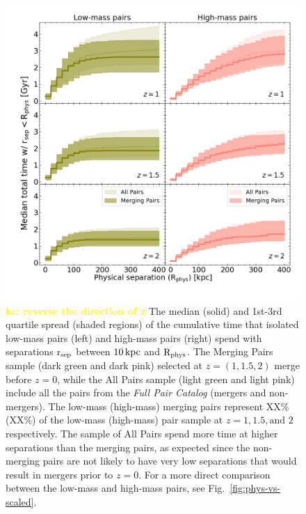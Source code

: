 \documentclass[twocolumn]{aastex631}
\newcommand{\kc}[1]{\textcolor{yellow}{\textbf{kc: #1}} }
\newcommand{\rsep}{\ensuremath{\rm r_{sep}}}
\newcommand{\paircat}{\textit{Full Pair Catalog}}
\newcommand{\Rphys}{\ensuremath{\rm R_{phys}}}
\newcommand{\rsep}{\ensuremath{\rm r_{sep}}}
\begin{document}
\begin{figure}[htb]
    \centering
    \includegraphics[width=\textwidth]{plots/bet-on-it/2_medtotal_LoHi.png}
    \caption{\kc{reverse the direction of z} 
    The median (solid) and 1st-3rd quartile spread (shaded regions) of the cumulative time that isolated low-mass pairs (left) and high-mass pairs (right) spend with separations \rsep{} between $10\mathrm{\,kpc}$ and \Rphys{}. 
    The Merging Pairs sample (dark green and dark pink) selected at $z=(1,1.5,2)$ merge before $z=0$, while the All Pairs sample (light green and light pink) include all the pairs from the \paircat{} (mergers and non-mergers).  
    The low-mass (high-mass) merging pairs represent XX\%(XX\%) of the low-mass (high-mass) pair sample at $z=1,1.5, \mbox{and } 2$ respectively. 
    The sample of All Pairs spend more time at higher separations than the merging pairs, as expected since the non-merging pairs are not likely to have very low separations that would result in mergers prior to $z=0$. 
    For a more direct comparison between the low-mass and high-mass pairs, see Fig.~\ref{fig:phys-vs-scaled}. 
    }
    \label{fig:low-vs-high}
\end{figure}
\end{document}
